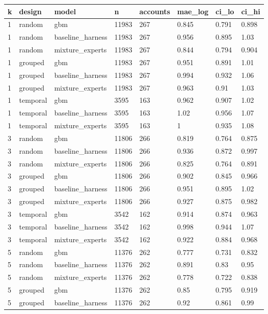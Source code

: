 \begin{tabular}{llllllll}
\toprule
k & design & model & n & accounts & mae\_log & ci\_lo & ci\_hi \\
\midrule
1 & random & gbm & 11983 & 267 & 0.845 & 0.791 & 0.898 \\
1 & random & baseline\_harness & 11983 & 267 & 0.956 & 0.895 & 1.03 \\
1 & random & mixture\_experts & 11983 & 267 & 0.844 & 0.794 & 0.904 \\
1 & grouped & gbm & 11983 & 267 & 0.951 & 0.891 & 1.01 \\
1 & grouped & baseline\_harness & 11983 & 267 & 0.994 & 0.932 & 1.06 \\
1 & grouped & mixture\_experts & 11983 & 267 & 0.963 & 0.91 & 1.03 \\
1 & temporal & gbm & 3595 & 163 & 0.962 & 0.907 & 1.02 \\
1 & temporal & baseline\_harness & 3595 & 163 & 1.02 & 0.956 & 1.07 \\
1 & temporal & mixture\_experts & 3595 & 163 & 1 & 0.935 & 1.08 \\
3 & random & gbm & 11806 & 266 & 0.819 & 0.764 & 0.875 \\
3 & random & baseline\_harness & 11806 & 266 & 0.936 & 0.872 & 0.997 \\
3 & random & mixture\_experts & 11806 & 266 & 0.825 & 0.764 & 0.891 \\
3 & grouped & gbm & 11806 & 266 & 0.902 & 0.845 & 0.966 \\
3 & grouped & baseline\_harness & 11806 & 266 & 0.951 & 0.895 & 1.02 \\
3 & grouped & mixture\_experts & 11806 & 266 & 0.927 & 0.875 & 0.982 \\
3 & temporal & gbm & 3542 & 162 & 0.914 & 0.874 & 0.963 \\
3 & temporal & baseline\_harness & 3542 & 162 & 0.998 & 0.944 & 1.07 \\
3 & temporal & mixture\_experts & 3542 & 162 & 0.922 & 0.884 & 0.968 \\
5 & random & gbm & 11376 & 262 & 0.777 & 0.731 & 0.832 \\
5 & random & baseline\_harness & 11376 & 262 & 0.891 & 0.83 & 0.95 \\
5 & random & mixture\_experts & 11376 & 262 & 0.778 & 0.722 & 0.838 \\
5 & grouped & gbm & 11376 & 262 & 0.85 & 0.795 & 0.919 \\
5 & grouped & baseline\_harness & 11376 & 262 & 0.92 & 0.861 & 0.99 \\

\end{tabular}
